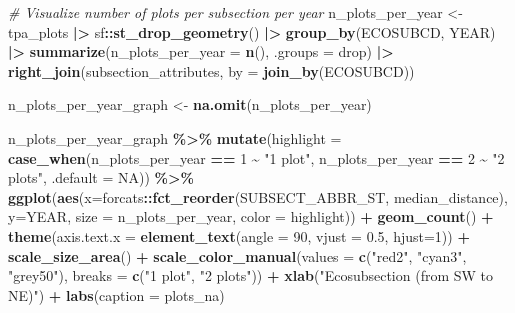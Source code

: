 \documentclass[
]{book}
\newenvironment{Shaded}{\begin{snugshade}}{\end{snugshade}}
\newcommand{\AttributeTok}[1]{\textcolor[rgb]{0.13,0.29,0.53}{#1}}
\newcommand{\CommentTok}[1]{\textcolor[rgb]{0.56,0.35,0.01}{\textit{#1}}}
\newcommand{\ConstantTok}[1]{\textcolor[rgb]{0.56,0.35,0.01}{#1}}
\newcommand{\DecValTok}[1]{\textcolor[rgb]{0.00,0.00,0.81}{#1}}
\newcommand{\FloatTok}[1]{\textcolor[rgb]{0.00,0.00,0.81}{#1}}
\newcommand{\FunctionTok}[1]{\textcolor[rgb]{0.13,0.29,0.53}{\textbf{#1}}}
\newcommand{\NormalTok}[1]{#1}
\newcommand{\OtherTok}[1]{\textcolor[rgb]{0.56,0.35,0.01}{#1}}
\newcommand{\SpecialCharTok}[1]{\textcolor[rgb]{0.81,0.36,0.00}{\textbf{#1}}}
\newcommand{\StringTok}[1]{\textcolor[rgb]{0.31,0.60,0.02}{#1}}
\begin{document}
\begin{Shaded}
\begin{Highlighting}[]
\CommentTok{\# Visualize number of plots per subsection per year}
\NormalTok{n\_plots\_per\_year }\OtherTok{\textless{}{-}}\NormalTok{ tpa\_plots }\SpecialCharTok{|\textgreater{}}
\NormalTok{  sf}\SpecialCharTok{::}\FunctionTok{st\_drop\_geometry}\NormalTok{() }\SpecialCharTok{|\textgreater{}}
  \FunctionTok{group\_by}\NormalTok{(ECOSUBCD, YEAR) }\SpecialCharTok{|\textgreater{}}
  \FunctionTok{summarize}\NormalTok{(}\AttributeTok{n\_plots\_per\_year =} \FunctionTok{n}\NormalTok{(), }\AttributeTok{.groups =} \StringTok{\textquotesingle{}drop\textquotesingle{}}\NormalTok{) }\SpecialCharTok{|\textgreater{}}
  \FunctionTok{right\_join}\NormalTok{(subsection\_attributes, }\AttributeTok{by =} \FunctionTok{join\_by}\NormalTok{(ECOSUBCD))}

\NormalTok{n\_plots\_per\_year\_graph }\OtherTok{\textless{}{-}} \FunctionTok{na.omit}\NormalTok{(n\_plots\_per\_year)}

\NormalTok{n\_plots\_per\_year\_graph }\SpecialCharTok{\%\textgreater{}\%}
  \FunctionTok{mutate}\NormalTok{(}\AttributeTok{highlight =} \FunctionTok{case\_when}\NormalTok{(n\_plots\_per\_year }\SpecialCharTok{==} \DecValTok{1} \SpecialCharTok{\textasciitilde{}} \StringTok{"1 plot"}\NormalTok{,}
\NormalTok{                               n\_plots\_per\_year }\SpecialCharTok{==} \DecValTok{2} \SpecialCharTok{\textasciitilde{}} \StringTok{"2 plots"}\NormalTok{,}
                               \AttributeTok{.default =} \ConstantTok{NA}\NormalTok{)) }\SpecialCharTok{\%\textgreater{}\%}
  \FunctionTok{ggplot}\NormalTok{(}\FunctionTok{aes}\NormalTok{(}\AttributeTok{x=}\NormalTok{forcats}\SpecialCharTok{::}\FunctionTok{fct\_reorder}\NormalTok{(SUBSECT\_ABBR\_ST, median\_distance), }
             \AttributeTok{y=}\NormalTok{YEAR, }
             \AttributeTok{size =}\NormalTok{ n\_plots\_per\_year, }
             \AttributeTok{color =}\NormalTok{ highlight)) }\SpecialCharTok{+}
  \FunctionTok{geom\_count}\NormalTok{() }\SpecialCharTok{+}
  \FunctionTok{theme}\NormalTok{(}\AttributeTok{axis.text.x =} \FunctionTok{element\_text}\NormalTok{(}\AttributeTok{angle =} \DecValTok{90}\NormalTok{, }\AttributeTok{vjust =} \FloatTok{0.5}\NormalTok{, }\AttributeTok{hjust=}\DecValTok{1}\NormalTok{)) }\SpecialCharTok{+}
  \FunctionTok{scale\_size\_area}\NormalTok{() }\SpecialCharTok{+}
  \FunctionTok{scale\_color\_manual}\NormalTok{(}\AttributeTok{values =} \FunctionTok{c}\NormalTok{(}\StringTok{"red2"}\NormalTok{, }\StringTok{"cyan3"}\NormalTok{, }\StringTok{"grey50"}\NormalTok{),}
                     \AttributeTok{breaks =} \FunctionTok{c}\NormalTok{(}\StringTok{"1 plot"}\NormalTok{, }\StringTok{"2 plots"}\NormalTok{)) }\SpecialCharTok{+}
  \FunctionTok{xlab}\NormalTok{(}\StringTok{"Ecosubsection (from SW to NE)"}\NormalTok{) }\SpecialCharTok{+}
  \FunctionTok{labs}\NormalTok{(}\AttributeTok{caption =}\NormalTok{ plots\_na)}
\end{Highlighting}
\end{Shaded}
\end{document}

